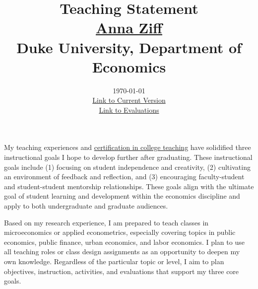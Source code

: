 


\setlength{\parskip}{\baselineskip}%
\setlength{\parindent}{0pt}%
\setlength{\droptitle}{-5em}

\usepackage{etoolbox}




\title{\normalsize \textbf{Teaching Statement} \\ \href{https://aziff.github.io}{Anna Ziff} \\ Duke University, Department of Economics}
\date{\vspace{-2.25cm} \normalsize \today \\ \href{https://www.dropbox.com/scl/fi/wudpph2wvd899x0qzkhly/AnnaZiff_TeachingStatement.pdf?rlkey=9dr7o4ngwtfz8iq8jr84s4ea8&dl=0}{Link to Current Version} \\ \href{https://aziff.github.io/teaching/}{Link to Evaluations}}
\maketitle


My teaching experiences and \href{https://gradschool.duke.edu/professional-development/programs/certificate-college-teaching/}{certification in college teaching} have solidified three instructional goals I hope to develop further after graduating. These instructional goals include (1) focusing on student independence and creativity, (2) cultivating an environment of feedback and reflection, and (3) encouraging faculty-student and student-student mentorship relationships. These goals align with the ultimate goal of student learning and development within the economics discipline and apply to both undergraduate and graduate audiences. 

Based on my research experience, I am prepared to teach classes in microeconomics or applied econometrics, especially covering topics in public economics, public finance, urban economics, and labor economics. I plan to use all teaching roles or class design assignments as an opportunity to deepen my own knowledge. Regardless of the particular topic or level, I aim to plan objectives, instruction, activities, and evaluations that support my three core goals. 

